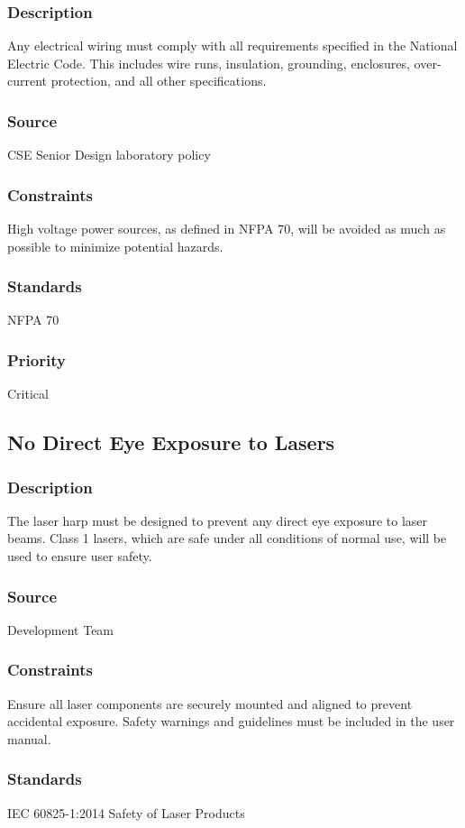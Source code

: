 \subsubsection{Description}
Any electrical wiring must comply with all requirements specified in the National Electric Code. This includes wire runs, insulation, grounding, enclosures, over-current protection, and all other specifications.
\subsubsection{Source}
CSE Senior Design laboratory policy
\subsubsection{Constraints}
High voltage power sources, as defined in NFPA 70, will be avoided as much as possible to minimize potential hazards.
\subsubsection{Standards}
NFPA 70
\subsubsection{Priority}
Critical

\subsection{No Direct Eye Exposure to Lasers}
\subsubsection{Description}
The laser harp must be designed to prevent any direct eye exposure to laser beams. Class 1 lasers, which are safe under all conditions of normal use, will be used to ensure user safety.
\subsubsection{Source}
Development Team
\subsubsection{Constraints}
Ensure all laser components are securely mounted and aligned to prevent accidental exposure. Safety warnings and guidelines must be included in the user manual.
\subsubsection{Standards}
IEC 60825-1:2014 Safety of Laser Products
